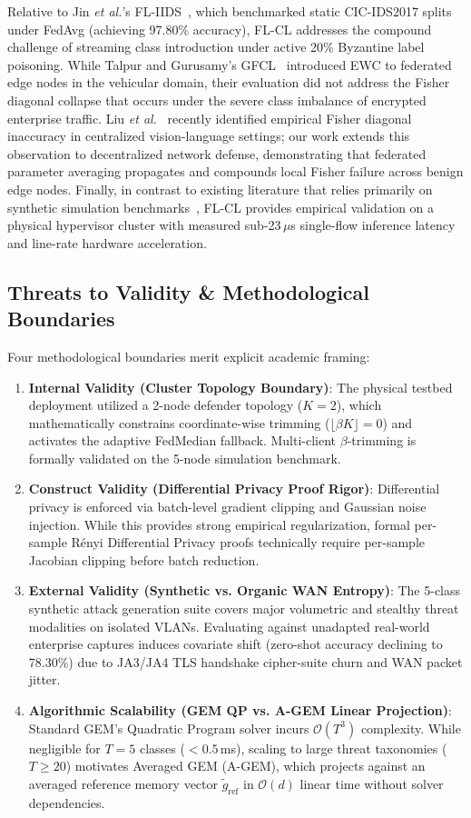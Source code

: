 \documentclass[journal,10pt,twocolumn]{IEEEtran}
\begin{document}
Relative to Jin \emph{et al.}'s FL-IIDS~\cite{jin2024fliids}, which benchmarked static CIC-IDS2017 splits under FedAvg (achieving 97.80\% accuracy), FL-CL addresses the compound challenge of streaming class introduction under active 20\% Byzantine label poisoning. While Talpur and Gurusamy's GFCL~\cite{talpur2022gfcl} introduced EWC to federated edge nodes in the vehicular domain, their evaluation did not address the Fisher diagonal collapse that occurs under the severe class imbalance of encrypted enterprise traffic. Liu \emph{et al.}~\cite{liu2026ewc} recently identified empirical Fisher diagonal inaccuracy in centralized vision-language settings; our work extends this observation to decentralized network defense, demonstrating that federated parameter averaging propagates and compounds local Fisher failure across benign edge nodes. Finally, in contrast to existing literature that relies primarily on synthetic simulation benchmarks~\cite{hamedi2025federated, hernandez2025intrusion}, FL-CL provides empirical validation on a physical hypervisor cluster with measured sub-23\,$\mu$s single-flow inference latency and line-rate hardware acceleration.

\subsection{Threats to Validity \& Methodological Boundaries}
Four methodological boundaries merit explicit academic framing:
\begin{enumerate}
    \item \textbf{Internal Validity (Cluster Topology Boundary)}: The physical testbed deployment utilized a 2-node defender topology ($K=2$), which mathematically constrains coordinate-wise trimming ($\lfloor \beta K \rfloor = 0$) and activates the adaptive FedMedian fallback. Multi-client $\beta$-trimming is formally validated on the 5-node simulation benchmark.
    \item \textbf{Construct Validity (Differential Privacy Proof Rigor)}: Differential privacy is enforced via batch-level gradient clipping and Gaussian noise injection. While this provides strong empirical regularization, formal per-sample Rényi Differential Privacy proofs technically require per-sample Jacobian clipping before batch reduction.
    \item \textbf{External Validity (Synthetic vs. Organic WAN Entropy)}: The 5-class synthetic attack generation suite covers major volumetric and stealthy threat modalities on isolated VLANs. Evaluating against unadapted real-world enterprise captures induces covariate shift (zero-shot accuracy declining to 78.30\%) due to JA3/JA4 TLS handshake cipher-suite churn and WAN packet jitter.
    \item \textbf{Algorithmic Scalability (GEM QP vs. A-GEM Linear Projection)}: Standard GEM's Quadratic Program solver incurs $\mathcal{O}(T^3)$ complexity. While negligible for $T=5$ classes ($<0.5$\,ms), scaling to large threat taxonomies ($T \ge 20$) motivates Averaged GEM (A-GEM), which projects against an averaged reference memory vector $\tilde{g}_{\text{ref}}$ in $\mathcal{O}(d)$ linear time without solver dependencies.
\end{enumerate}
\end{document}
